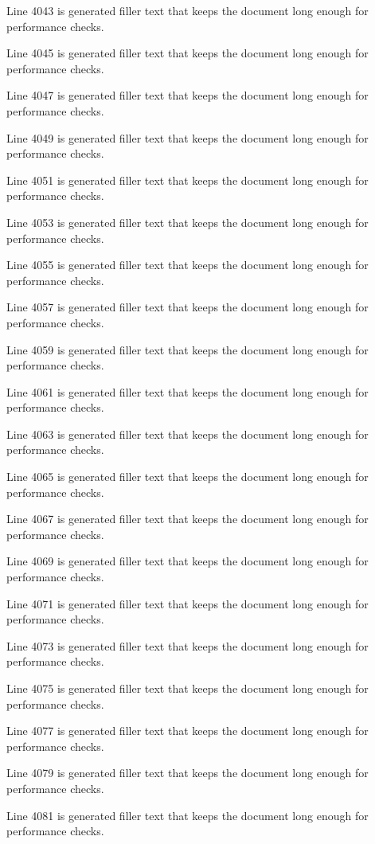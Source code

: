 Line 4043 is generated filler text that keeps the document long enough for performance checks.

Line 4045 is generated filler text that keeps the document long enough for performance checks.

Line 4047 is generated filler text that keeps the document long enough for performance checks.

Line 4049 is generated filler text that keeps the document long enough for performance checks.

Line 4051 is generated filler text that keeps the document long enough for performance checks.

Line 4053 is generated filler text that keeps the document long enough for performance checks.

Line 4055 is generated filler text that keeps the document long enough for performance checks.

Line 4057 is generated filler text that keeps the document long enough for performance checks.

Line 4059 is generated filler text that keeps the document long enough for performance checks.

Line 4061 is generated filler text that keeps the document long enough for performance checks.

Line 4063 is generated filler text that keeps the document long enough for performance checks.

Line 4065 is generated filler text that keeps the document long enough for performance checks.

Line 4067 is generated filler text that keeps the document long enough for performance checks.

Line 4069 is generated filler text that keeps the document long enough for performance checks.

Line 4071 is generated filler text that keeps the document long enough for performance checks.

Line 4073 is generated filler text that keeps the document long enough for performance checks.

Line 4075 is generated filler text that keeps the document long enough for performance checks.

Line 4077 is generated filler text that keeps the document long enough for performance checks.

Line 4079 is generated filler text that keeps the document long enough for performance checks.

Line 4081 is generated filler text that keeps the document long enough for performance checks.

